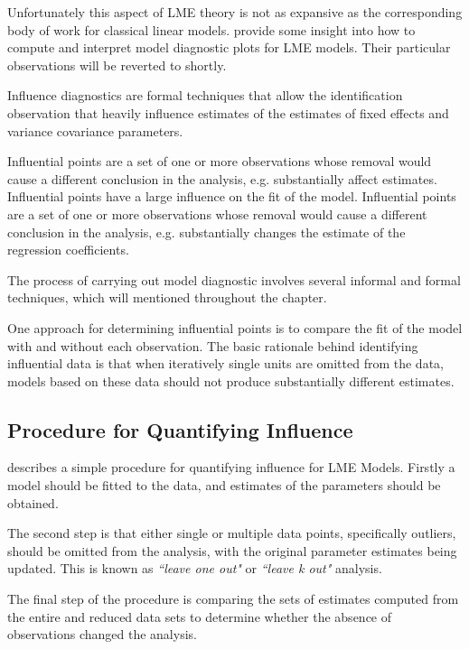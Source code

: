 \documentclass[12pt, a4paper]{report}
\theoremstyle{definition}
\theoremstyle{remark}
\begin{document}
Unfortunately this aspect of LME theory is not as expansive as the corresponding body of work for classical linear models. \citet{PB} provide some insight into how to compute and interpret model diagnostic plots for LME models. Their particular observations will be reverted to shortly. 


Influence diagnostics are formal techniques that allow the identification observation that heavily influence estimates of the estimates of fixed effects and variance covariance parameters.


Influential points are a set of one or more observations whose removal would cause a different conclusion in the analysis, e.g. substantially affect estimates. 
Influential points have a large influence on the fit of the model. Influential points are a set of one or more observations whose removal would cause a different conclusion in the analysis, e.g. substantially changes the estimate of the regression coefficients. 




The process of carrying out model diagnostic involves several informal and formal techniques, which will mentioned throughout the chapter.




One approach for determining influential points is to compare the fit of the model with and without each observation. The basic rationale behind identifying influential data is that when iteratively single units are omitted from the data, models based on these data should not produce substantially different estimates. 


\subsection*{Procedure for Quantifying Influence}






\citet{schabenberger} describes a simple procedure for quantifying influence for LME Models. Firstly a model should be fitted to the data, and estimates of the parameters should be obtained. 

The second step is that either single or multiple data points, specifically outliers, should be omitted from the analysis, with the original parameter estimates being updated. This is known as \textit{``leave one out"} or \textit{``leave k out"} analysis. 

The final step of the procedure is comparing the sets of estimates computed from the entire and reduced data sets to determine whether the absence of observations changed the analysis. 
\end{document}
